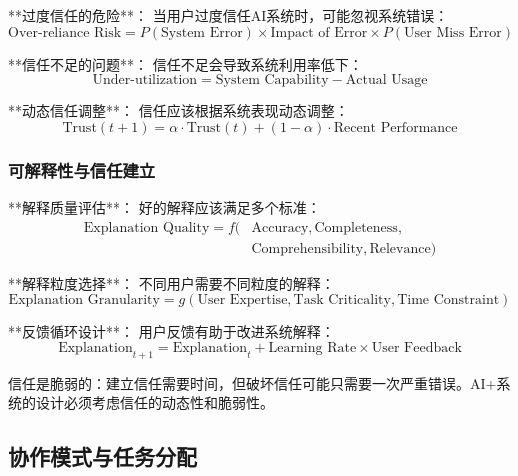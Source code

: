 **过度信任的危险**：
当用户过度信任AI系统时，可能忽视系统错误：
\begin{equation}
\text{Over-reliance Risk} = P(\text{System Error}) \times \text{Impact of Error} \times P(\text{User Miss Error})
\end{equation}

**信任不足的问题**：
信任不足会导致系统利用率低下：
\begin{equation}
\text{Under-utilization} = \text{System Capability} - \text{Actual Usage}
\end{equation}

**动态信任调整**：
信任应该根据系统表现动态调整：
\begin{equation}
\text{Trust}(t+1) = \alpha \cdot \text{Trust}(t) + (1-\alpha) \cdot \text{Recent Performance}
\end{equation}

\subsubsection{可解释性与信任建立} %

**解释质量评估**：
好的解释应该满足多个标准：
\begin{align}
\text{Explanation Quality} = f(&\text{Accuracy}, \text{Completeness}, \\
&\text{Comprehensibility}, \text{Relevance})
\end{align}

**解释粒度选择**：
不同用户需要不同粒度的解释：
\begin{equation}
\text{Explanation Granularity} = g(\text{User Expertise}, \text{Task Criticality}, \text{Time Constraint})
\end{equation}

**反馈循环设计**：
用户反馈有助于改进系统解释：
\begin{equation}
\text{Explanation}_{t+1} = \text{Explanation}_t + \text{Learning Rate} \times \text{User Feedback}
\end{equation}

\begin{center}
信任是脆弱的：建立信任需要时间，但破坏信任可能只需要一次严重错误。AI+系统的设计必须考虑信任的动态性和脆弱性。
\end{center}

\subsection{协作模式与任务分配}

